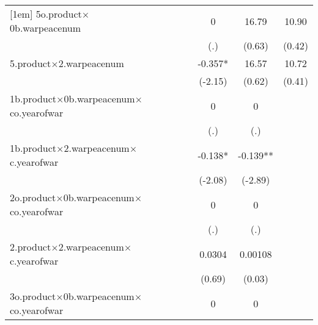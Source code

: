 {\begin{tabular}{l*{6}{c}}
[1em]
5o.product$\times$0b.warpeacenum&                     &                     &                     &           0         &       16.79         &       10.90         \\
                    &                     &                     &                     &         (.)         &      (0.63)         &      (0.42)         \\
[1em]
5.product$\times$2.warpeacenum&                     &                     &                     &      -0.357*  &       16.57         &       10.72         \\
                    &                     &                     &                     &     (-2.15)         &      (0.62)         &      (0.41)         \\
[1em]
1b.product$\times$0b.warpeacenum$\times$co.yearofwar&                     &                     &                     &           0         &           0         &                     \\
                    &                     &                     &                     &         (.)         &         (.)         &                     \\
[1em]
1b.product$\times$2.warpeacenum$\times$c.yearofwar&                     &                     &                     &      -0.138*  &      -0.139** &                     \\
                    &                     &                     &                     &     (-2.08)         &     (-2.89)         &                     \\
[1em]
2o.product$\times$0b.warpeacenum$\times$co.yearofwar&                     &                     &                     &           0         &           0         &                     \\
                    &                     &                     &                     &         (.)         &         (.)         &                     \\
[1em]
2.product$\times$2.warpeacenum$\times$c.yearofwar&                     &                     &                     &      0.0304         &     0.00108         &                     \\
                    &                     &                     &                     &      (0.69)         &      (0.03)         &                     \\
[1em]
3o.product$\times$0b.warpeacenum$\times$co.yearofwar&                     &                     &                     &           0         &           0         &                     \\

\end{tabular}}
